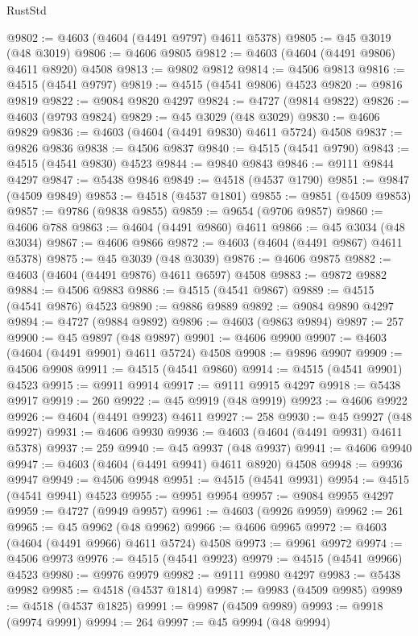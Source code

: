 \begin{lexlean}{RustStd}
\begin{coremodule}
@9802 := @4603 (@4604 (@4491 @9797) @4611 @5378)
@9805 := @45 @3019 (@48 @3019)
@9806 := @4606 @9805
@9812 := @4603 (@4604 (@4491 @9806) @4611 @8920) @4508
@9813 := @9802 @9812
@9814 := @4506 @9813
@9816 := @4515 (@4541 @9797)
@9819 := @4515 (@4541 @9806) @4523
@9820 := @9816 @9819
@9822 := @9084 @9820 @4297
@9824 := @4727 (@9814 @9822)
@9826 := @4603 (@9793 @9824)
@9829 := @45 @3029 (@48 @3029)
@9830 := @4606 @9829
@9836 := @4603 (@4604 (@4491 @9830) @4611 @5724) @4508
@9837 := @9826 @9836
@9838 := @4506 @9837
@9840 := @4515 (@4541 @9790)
@9843 := @4515 (@4541 @9830) @4523
@9844 := @9840 @9843
@9846 := @9111 @9844 @4297
@9847 := @5438 @9846
@9849 := @4518 (@4537 @1790)
@9851 := @9847 (@4509 @9849)
@9853 := @4518 (@4537 @1801)
@9855 := @9851 (@4509 @9853)
@9857 := @9786 (@9838 @9855)
@9859 := @9654 (@9706 @9857)
@9860 := @4606 @788
@9863 := @4604 (@4491 @9860) @4611
@9866 := @45 @3034 (@48 @3034)
@9867 := @4606 @9866
@9872 := @4603 (@4604 (@4491 @9867) @4611 @5378)
@9875 := @45 @3039 (@48 @3039)
@9876 := @4606 @9875
@9882 := @4603 (@4604 (@4491 @9876) @4611 @6597) @4508
@9883 := @9872 @9882
@9884 := @4506 @9883
@9886 := @4515 (@4541 @9867)
@9889 := @4515 (@4541 @9876) @4523
@9890 := @9886 @9889
@9892 := @9084 @9890 @4297
@9894 := @4727 (@9884 @9892)
@9896 := @4603 (@9863 @9894)
@9897 := 257
@9900 := @45 @9897 (@48 @9897)
@9901 := @4606 @9900
@9907 := @4603 (@4604 (@4491 @9901) @4611 @5724) @4508
@9908 := @9896 @9907
@9909 := @4506 @9908
@9911 := @4515 (@4541 @9860)
@9914 := @4515 (@4541 @9901) @4523
@9915 := @9911 @9914
@9917 := @9111 @9915 @4297
@9918 := @5438 @9917
@9919 := 260
@9922 := @45 @9919 (@48 @9919)
@9923 := @4606 @9922
@9926 := @4604 (@4491 @9923) @4611
@9927 := 258
@9930 := @45 @9927 (@48 @9927)
@9931 := @4606 @9930
@9936 := @4603 (@4604 (@4491 @9931) @4611 @5378)
@9937 := 259
@9940 := @45 @9937 (@48 @9937)
@9941 := @4606 @9940
@9947 := @4603 (@4604 (@4491 @9941) @4611 @8920) @4508
@9948 := @9936 @9947
@9949 := @4506 @9948
@9951 := @4515 (@4541 @9931)
@9954 := @4515 (@4541 @9941) @4523
@9955 := @9951 @9954
@9957 := @9084 @9955 @4297
@9959 := @4727 (@9949 @9957)
@9961 := @4603 (@9926 @9959)
@9962 := 261
@9965 := @45 @9962 (@48 @9962)
@9966 := @4606 @9965
@9972 := @4603 (@4604 (@4491 @9966) @4611 @5724) @4508
@9973 := @9961 @9972
@9974 := @4506 @9973
@9976 := @4515 (@4541 @9923)
@9979 := @4515 (@4541 @9966) @4523
@9980 := @9976 @9979
@9982 := @9111 @9980 @4297
@9983 := @5438 @9982
@9985 := @4518 (@4537 @1814)
@9987 := @9983 (@4509 @9985)
@9989 := @4518 (@4537 @1825)
@9991 := @9987 (@4509 @9989)
@9993 := @9918 (@9974 @9991)
@9994 := 264
@9997 := @45 @9994 (@48 @9994)

\end{coremodule}
\end{lexlean}
